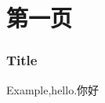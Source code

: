 \documentclass[aspectratio=169,UTF8]{beamer}
\begin{document}
\section{第一页}

\begin{frame}
\frametitle{Title}
Example,hello.你好
\end{frame}
\end{document}
